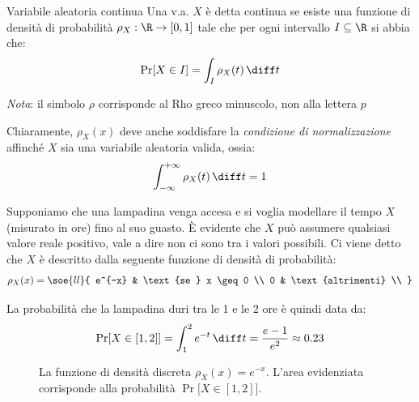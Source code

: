 \documentclass[a4paper, 12pt]{report}
\begin{document}
    \begin{frameddefn}{Variabile aleatoria continua}
        Una v.a. $X$ è detta continua se esiste una funzione di densità di probabilità $\rho_X : \R \to [0, 1]$ tale che per ogni intervallo $I \subseteq \R$ si abbia che:
        \[\Pr[X \in I] = \int_I \rho_X(t) \, \diff t\]

        \textit{Nota}: il simbolo $\rho$ corrisponde al Rho greco minuscolo, non alla lettera $p$
    \end{frameddefn}

    Chiaramente, $\rho_X(x)$ deve anche soddisfare la \textit{condizione di normalizzazione} affinché $X$ sia una variabile aleatoria valida, ossia:
    \[\int_{-\infty}^{+\infty} \rho_X(t) \, \diff t = 1\]

    Supponiamo che una lampadina venga accesa e si voglia modellare il tempo $X$ (misurato in ore) fino al suo guasto. È evidente che $X$ può assumere qualsiasi valore reale positivo, vale a dire non ci sono  tra i valori possibili. Ci viene detto che $X$ è descritto dalla seguente funzione di densità di probabilità:
    \[\rho_X(x) = \soe{ll}{
        e^{-x} & \text{se } x \geq 0 \\
        0 & \text{altrimenti} \\
    }\]

    La probabilità che la lampadina duri tra le 1 e le 2 ore è quindi data da:
    \[\Pr[X \in [1,2]] = \int_{1}^{2} e^{-t} \, \diff t = \frac{e-1}{e^2} \approx 0.23\]

    \begin{figure}[H]
        \centering

        \caption{La funzione di densità discreta $\rho_X(x) = e^{-x}$. L'area evidenziata corrisponde alla probabilità $\Pr[X \in [1,2]$].}
    \end{figure}
\end{document}
